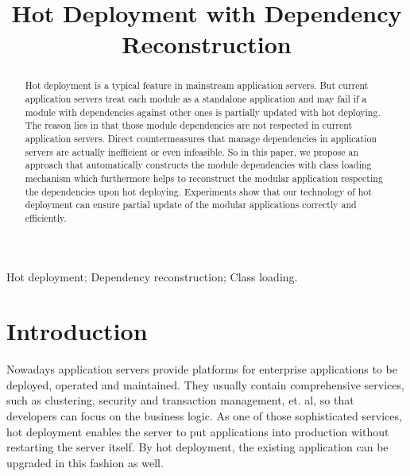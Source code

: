 \documentclass[conference]{IEEEtran}
\begin{document}
\title{Hot Deployment with Dependency Reconstruction}

\author{
}

\maketitle


\begin{abstract}
Hot deployment is a typical feature in mainstream application servers. But current application servers treat each module as a standalone application and may fail if a module with dependencies against other ones is partially updated with hot deploying. The reason lies in that those module dependencies are not respected in current application servers. Direct countermeasures that manage dependencies in application servers are actually inefficient or even infeasible. So in this paper, we propose an approach that automatically constructs the module dependencies with class loading mechanism which furthermore helps to reconstruct the modular application respecting the dependencies upon hot deploying. Experiments show that our technology of hot deployment can ensure partial update of the modular applications correctly and efficiently.
\end{abstract}

\begin{IEEEkeywords}
Hot deployment; Dependency reconstruction; Class loading.
\end{IEEEkeywords}


\IEEEpeerreviewmaketitle


\section{Introduction\label{sec:introduction}}

Nowadays application servers\cite{app_server} provide platforms for enterprise applications to be deployed, operated and maintained. They usually contain comprehensive services, such as clustering, security and transaction management, et. al, so that developers can focus on the business logic. As one of those sophisticated services, hot deployment enables the server to put applications into production without restarting the server itself. By hot deployment, the existing application can be upgraded in this fashion as well.
\end{document}
